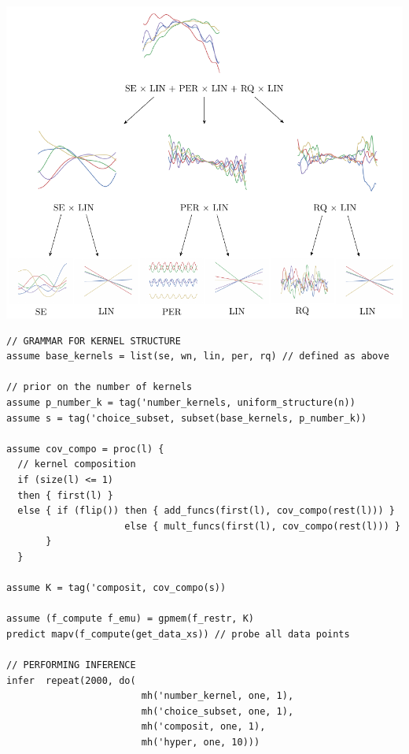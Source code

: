\documentclass[a0,portrait]{a0poster}
\begin{document}
\begin{multicols}{3}
\begin{center}\vspace{1cm}
\includegraphics[width=0.8\linewidth]{parseTree.pdf}
\end{center}
\vspace{1cm}

\begin{minipage}{\linewidth}
\small
\begin{lstlisting}[frame=single,label=alg:structureVent,mathescape]
// GRAMMAR FOR KERNEL STRUCTURE
assume base_kernels = list(se, wn, lin, per, rq) // defined as above

// prior on the number of kernels
assume p_number_k = tag('number_kernels, uniform_structure(n))
assume s = tag('choice_subset, subset(base_kernels, p_number_k))

assume cov_compo = proc(l) {
  // kernel composition
  if (size(l) <= 1)
  then { first(l) }
  else { if (flip()) then { add_funcs(first(l), cov_compo(rest(l))) }
                     else { mult_funcs(first(l), cov_compo(rest(l))) }
       }
  }
                          
assume K = tag('composit, cov_compo(s))

assume (f_compute f_emu) = gpmem(f_restr, K)
predict mapv(f_compute(get_data_xs)) // probe all data points

// PERFORMING INFERENCE  
infer  repeat(2000, do(
                        mh('number_kernel, one, 1),
                        mh('choice_subset, one, 1),
                        mh('composit, one, 1),
                        mh('hyper, one, 10)))
\end{lstlisting}


\end{minipage}
\end{multicols}
\end{document}

